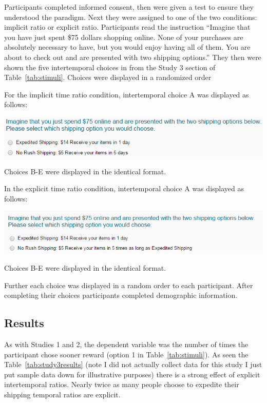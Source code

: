 \documentclass[]{article}
\begin{document}
Participants completed informed consent, then were given a test to ensure they understood the paradigm.
Next they were assigned to one of the two conditions: implicit ratio or explicit ratio. 
Participants read the instruction
``Imagine that you have just spent \$75 dollars shopping online. None of your purchases are absolutely necessary to have, but you would enjoy having all of them. You are about to check out and are presented with two shipping options.''
They then were shown the five intertemporal choices in from the Study 3 section of  Table~\ref{tab:stimuli}. 
Choices were displayed in a randomized order


For the implicit time ratio condition, intertemporal choice A was displayed as follows: 

\includegraphics[]{study3_implicit}

Choices B-E were displayed in the identical format. 

In the explicit time ratio condition, intertemporal choice A was displayed as follows:

\includegraphics[]{study3_explicit}

Choices B-E were displayed in the identical format. 

Further each choice was displayed in a random order to each participant. 
After completing their choices participants completed demographic information.


\subsection{Results}

As with Studies 1 and 2, the dependent variable was the number of times the participant chose sooner reward (option 1 in Table~\ref{tab:stimuli}). 
As seen the Table~\ref{tab:study3results} (note I did not actually collect data for this study I just put sample data down for illustrative purposes) there is a strong effect of explicit intertemporal ratios. 
Nearly twice as many people choose to expedite their shipping temporal ratios are explicit.
\end{document}
